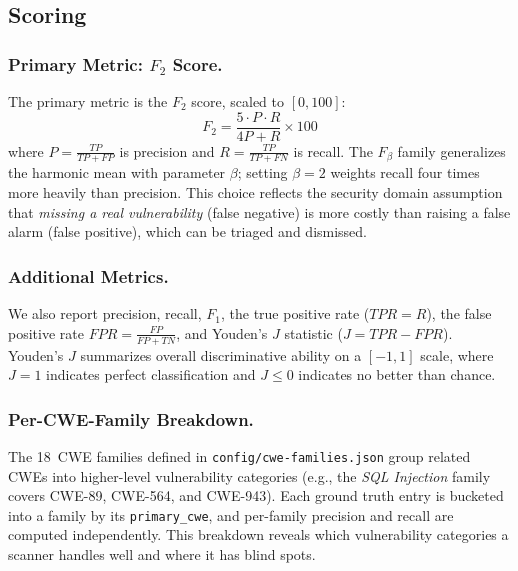 \subsection{Scoring}
\label{sec:scoring}

\subsubsection{Primary Metric: $F_2$ Score.}
The primary metric is the $F_2$ score, scaled to $[0, 100]$:
\begin{equation}
  F_2 = \frac{5 \cdot P \cdot R}{4P + R} \times 100
  \label{eq:f2}
\end{equation}
where $P = \frac{\mathit{TP}}{\mathit{TP} + \mathit{FP}}$ is precision and $R = \frac{\mathit{TP}}{\mathit{TP} + \mathit{FN}}$ is recall.
The $F_\beta$ family generalizes the harmonic mean with parameter $\beta$; setting $\beta = 2$ weights recall four times more heavily than precision.
This choice reflects the security domain assumption that \emph{missing a real vulnerability} (false negative) is more costly than raising a false alarm (false positive), which can be triaged and dismissed.

\subsubsection{Additional Metrics.}
We also report precision, recall, $F_1$, the true positive rate ($\mathit{TPR} = R$), the false positive rate $\mathit{FPR} = \frac{\mathit{FP}}{\mathit{FP} + \mathit{TN}}$, and Youden's $J$ statistic ($J = \mathit{TPR} - \mathit{FPR}$).
Youden's $J$ summarizes overall discriminative ability on a $[-1, 1]$ scale, where $J = 1$ indicates perfect classification and $J \leq 0$ indicates no better than chance.

\subsubsection{Per-CWE-Family Breakdown.}
The 18~CWE families defined in \texttt{config/cwe-families.json} group related CWEs into higher-level vulnerability categories (e.g., the \emph{SQL Injection} family covers CWE-89, CWE-564, and CWE-943).
Each ground truth entry is bucketed into a family by its \texttt{primary\_cwe}, and per-family precision and recall are computed independently.
This breakdown reveals which vulnerability categories a scanner handles well and where it has blind spots.

